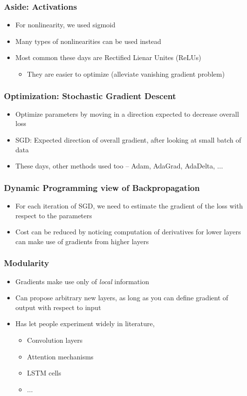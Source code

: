 \documentclass[10pt,mathserif]{beamer}
\begin{document}
\begin{frame}
  \frametitle{Aside: Activations}
  \begin{itemize}
  \item For nonlinearity, we used sigmoid
  \item Many types of nonlinearities can be used instead
  \item Most common these days are Rectified Lienar Unites (ReLUs)
    \begin{itemize}
    \item They are easier to optimize (alleviate vanishing gradient problem)
    \end{itemize}
  \end{itemize} 
\end{frame}

\begin{frame}
  \frametitle{Optimization: Stochastic Gradient Descent}
  \begin{itemize}
  \item Optimize parameters by moving in a direction expected to decrease
    overall loss
  \item SGD: Expected direction of overall gradient, after looking at small
    batch of data
  \item These days, other methods used too -- Adam, AdaGrad, AdaDelta, ...
  \end{itemize}
\end{frame}

\begin{frame}
  \frametitle{Dynamic Programming view of Backpropagation}
  \begin{itemize}
  \item For each iteration of SGD, we need to estimate the gradient of the loss
    with respect to the parameters
  \item Cost can be reduced by noticing computation of derivatives for lower
    layers can make use of gradients from higher layers
  \end{itemize}
  \begin{figure}
    \centering
    \caption{\label{fig:backprop_diagram} }
  \end{figure}
\end{frame}

\begin{frame}
  \frametitle{Modularity}
  \begin{itemize}
  \item Gradients make use only of \textit{local} information
  \item Can propose arbitrary new layers, as long as you can define gradient of
    output with respect to input
  \item Has let people experiment widely in literature,
    \begin{itemize}
    \item Convolution layers
    \item Attention mechanisms
    \item LSTM cells
    \item ...
    \end{itemize}
  \end{itemize} 
\end{frame}
\end{document}
